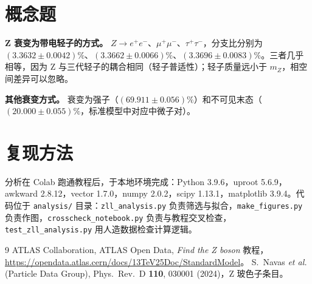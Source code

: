\documentclass[11pt,a4paper,fontset=windows]{ctexart}
\begin{document}
\section{概念题}

\textbf{Z 衰变为带电轻子的方式。} $Z\to e^+e^-$、$\mu^+\mu^-$、$\tau^+\tau^-$，分支比分别为 $(3.3632\pm0.0042)\%$、$(3.3662\pm0.0066)\%$、$(3.3696\pm0.0083)\%$\cite{pdg}。三者几乎相等，因为 Z 与三代轻子的耦合相同（轻子普适性）；轻子质量远小于 $m_Z$，相空间差异可以忽略。

\textbf{其他衰变方式。} 衰变为强子（$(69.911\pm0.056)\%$）和不可见末态（$(20.000\pm0.055)\%$，标准模型中对应中微子对）\cite{pdg}。

\section{复现方法}

分析在 Colab 跑通教程后，于本地环境完成：Python 3.9.6，uproot 5.6.9，awkward 2.8.12，vector 1.7.0，numpy 2.0.2，scipy 1.13.1，matplotlib 3.9.4。代码位于 \texttt{analysis/} 目录：\texttt{zll\_analysis.py} 负责筛选与拟合，\texttt{make\_figures.py} 负责作图，\texttt{crosscheck\_notebook.py} 负责与教程交叉检查，\texttt{test\_zll\_analysis.py} 用人造数据检查计算逻辑。

\begin{thebibliography}{9}
 ATLAS Collaboration, ATLAS Open Data, \emph{Find the Z boson} 教程，\url{https://opendata.atlas.cern/docs/13TeV25Doc/StandardModel}。
 S.~Navas \emph{et al.} (Particle Data Group), Phys.\ Rev.\ D \textbf{110}, 030001 (2024)，Z 玻色子条目。
\end{thebibliography}
\end{document}
